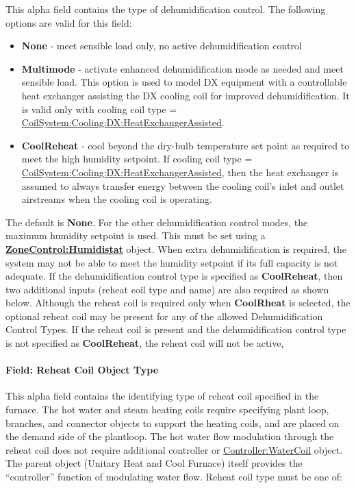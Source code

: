 This alpha field contains the type of dehumidification control. The following options are valid for this field:

\begin{itemize}
\item
  \textbf{None} - meet sensible load only, no active dehumidification control
\item
  \textbf{Multimode} - activate enhanced dehumidification mode as needed and meet sensible load. This option is used to model DX equipment with a controllable heat exchanger assisting the DX cooling coil for improved dehumidification. It is valid only with cooling coil type = \hyperref[coilsystemcoolingdxheatexchangerassisted]{CoilSystem:Cooling:DX:HeatExchangerAssisted}.
\item
  \textbf{CoolReheat} - cool beyond the dry-bulb temperature set point as required to meet the high humidity setpoint. If cooling coil type = \hyperref[coilsystemcoolingdxheatexchangerassisted]{CoilSystem:Cooling:DX:HeatExchangerAssisted}, then the heat exchanger is assumed to always transfer energy between the cooling coil's inlet and outlet airstreams when the cooling coil is operating.
\end{itemize}

The default is \textbf{None}. For the other dehumidification control modes, the maximum humidity setpoint is used. This must be set using a \textbf{\hyperref[zonecontrolhumidistat]{ZoneControl:Humidistat}} object. When extra dehumidification is required, the system may not be able to meet the humidity setpoint if its full capacity is not adequate. If the dehumidification control type is specified as \textbf{CoolReheat}, then two additional inputs (reheat coil type and name) are also required as shown below. Although the reheat coil is required only when \textbf{CoolRheat} is selected, the optional reheat coil may be present for any of the allowed Dehumidification Control Types. If the reheat coil is present and the dehumidification control type is not specified as \textbf{CoolReheat}, the reheat coil will not be active,

\paragraph{Field: Reheat Coil Object Type}\label{field-reheat-coil-object-type-000}

This alpha field contains the identifying type of reheat coil specified in the furnace. The hot water and steam heating coils require specifying plant loop, branches, and connector objects to support the heating coils, and are placed on the demand side of the plantloop. The hot water flow modulation through the reheat coil does not require additional controller or \hyperref[controllerwatercoil]{Controller:WaterCoil} object. The parent object (Unitary Heat and Cool Furnace) itself provides the ``controller'' function of modulating water flow. Reheat coil type must be one of:

